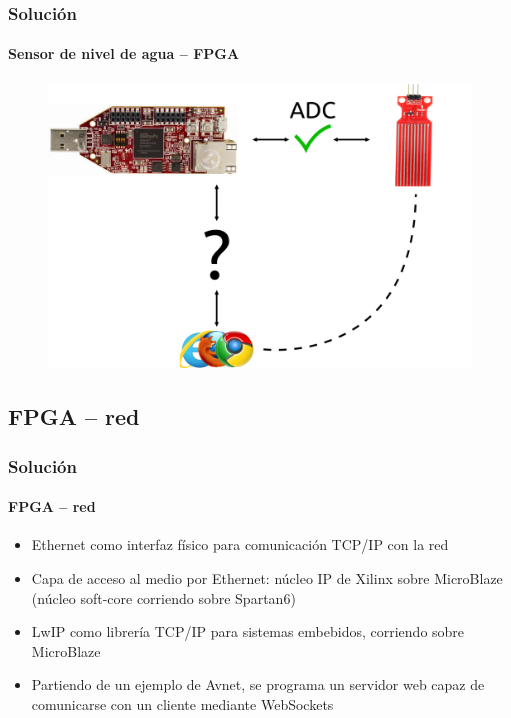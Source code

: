 \documentclass[compress]{beamer}
\begin{document}
		\begin{frame}
			\frametitle{Soluci\'on}
			\framesubtitle{Sensor de nivel de agua -- FPGA}
				\begin{figure}
					\includegraphics[keepaspectratio = true, totalheight=0.6\textheight]{figuras/adc_ok.png}
				\end{figure}
 		\end{frame}

	\subsection{FPGA -- red}
		\begin{frame}
			\frametitle{Soluci\'on}
			\framesubtitle{FPGA -- red}
				\begin{itemize}
					\item
					{

						Ethernet como interfaz f\'isico para comunicaci\'on TCP/IP con la red

					}
					\item
					{

						Capa de acceso al medio por Ethernet: n\'ucleo IP de Xilinx sobre MicroBlaze (n\'ucleo soft-core corriendo sobre Spartan6)

					}
					\item
					{

						LwIP como librer\'ia TCP/IP para sistemas embebidos, corriendo sobre MicroBlaze

					}
					\item
					{

						Partiendo de un ejemplo de Avnet, se programa un servidor web capaz de comunicarse con un cliente mediante WebSockets

					}
				\end{itemize}

 		\end{frame}
\end{document}
